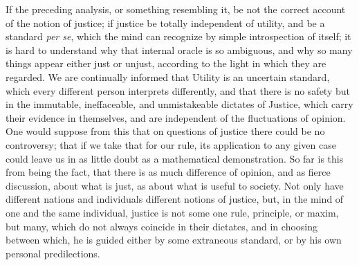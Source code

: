 \documentclass[12pt]{report}
\begin{document}
If the preceding analysis, or something resembling it, be not the correct account of the notion of justice; if justice be totally independent of utility, and be a standard \emph{per se}, which the mind can recognize by simple introspection of itself; it is hard to understand why that internal oracle is so ambiguous, and why so many things appear either just or unjust, according to the light in which they are regarded. We are continually informed that Utility is an uncertain standard, which every different person interprets differently, and that there is no safety but in the immutable, ineffaceable, and unmistakeable dictates of Justice, which carry their evidence in themselves, and are independent of the fluctuations of opinion. One would suppose from this that on questions of justice there could be no controversy; that if we take that for our rule, its application to any given case could leave us in as little doubt as a mathematical demonstration. So far is this from being the fact, that there is as much difference of opinion, and as fierce discussion, about what is just, as about what is useful to society. Not only have different nations and individuals different notions of justice, but, in the mind of one and the same individual, justice is not some one rule, principle, or maxim, but many, which do not always coincide in their dictates, and in choosing between which, he is guided either by some extraneous standard, or by his own personal predilections.
\end{document}
